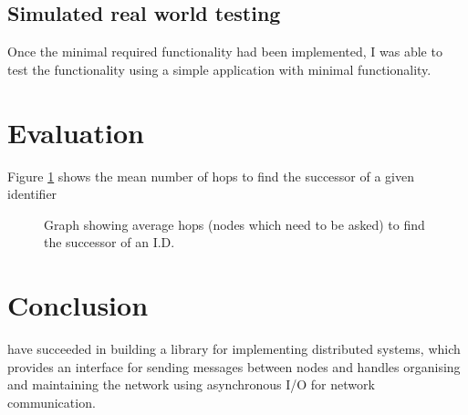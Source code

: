 \documentclass{article}
\begin{document}
\subsection{Simulated real world testing}

Once the minimal required functionality had been implemented, I was able to test the functionality using a simple application with minimal functionality.

\section{Evaluation}

Figure \ref{fig:fingerperf} shows the mean number of hops to find the successor of a given identifier

\begin{figure}
\begin{center}
\end{center}
\caption{Graph showing average hops (nodes which need to be asked) to find the successor of an I.D.}
\label{fig:fingerperf}
\end{figure}



\section{Conclusion}

have succeeded in building a library for implementing distributed systems, which provides an interface for sending messages between nodes and handles organising and maintaining the network using asynchronous I/O for network communication.
\end{document}
